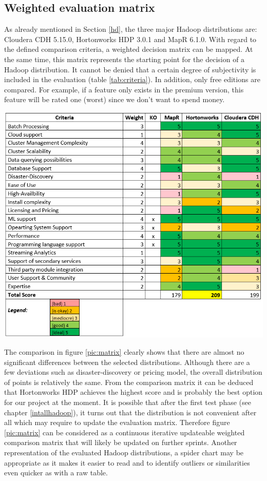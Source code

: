 \subsection{Weighted evaluation matrix}\label{weight}
As already mentioned in Section \ref{hd}, the three major Hadoop distributions are: Cloudera CDH 5.15.0,
Hortonworks HDP 3.0.1 and MapR 6.1.0. With regard to the defined comparison criteria, a weighted
decision matrix can be mapped. At the same time, this matrix represents the starting point for the decision of a Hadoop distribution. It cannot be denied that a certain degree of subjectivity is included in the evaluation (table \ref{tab:criteria}). In addition, only free editions are compared. For example, if a feature only exists in the premium version, this feature will be rated one (worst) since we don’t want to spend money.
\begin{center}
\includegraphics[width=1.0\textwidth]{img/matrix}
\label{pic:matrix}
\end{center}
The comparison in figure \ref{pic:matrix} clearly shows that there are almost no significant differences between the selected distributions. Although there are a few deviations such as disaster-discovery or pricing model, the overall distribution of points is relatively the same. From the comparison matrix it can be deduced that Hortonworks HDP achieves the highest score and is probably the best option for our project at the moment. It is possible that after the first test phase (see chapter \ref{intallhadoop}), it turns out that the distribution is not convenient after all which may require to update the evaluation matrix. Therefore figure \ref{pic:matrix} can be considered as a continuous iterative updateable weighted comparison matrix that will likely be updated on further sprints. Another representation of the evaluated Hadoop distributions, a spider chart may be appropriate as it makes it easier to read and to identify outliers or similarities even quicker as with a raw table.
